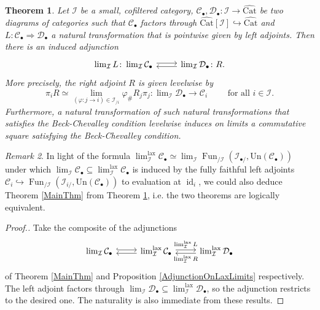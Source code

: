 \documentclass[a4paper,reqno,10pt]{amsart}
\newtheorem{theorem}{Theorem}[section]
\theoremstyle{definition}
\theoremstyle{remark}
\newtheorem{remark}[theorem]{Remark}
\newcommand{\sqb}[1]{\left\lbrack #1\right\rbrack}
\newcommand{\C}{\mathcal{C}}
\newcommand{\D}{\mathcal{D}}
\newcommand{\I}{\mathcal{I}}
\newcommand{\id}{\operatorname{id}}
\newcommand{\Fun}{\operatorname{Fun}}
\newcommand{\Un}{\mathrm{Un}}
\newcommand{\Cat}{\mathrm{Cat}}
\newcommand{\lax}{\mathrm{lax}}
\newcommand{\Adj}{\arrow[r,shift left=0.2em]\arrow[r,leftarrow,shift right=0.2em]}
\begin{document}
\begin{theorem}\label{Adjunction}
Let $\I$ be a small, cofiltered category, $\C_{\bullet},\D_{\bullet}\colon\I\rightarrow\widehat{\Cat}$ be two diagrams of categories such that $\C_{\bullet}$ factors through $\widehat{\Cat}\sqb{\I}\hookrightarrow\widehat{\Cat}$ and $L\colon\C_{\bullet}\Rightarrow\D_{\bullet}$ a natural transformation that is pointwise given by left adjoints. Then there is an induced adjunction
\begin{equation*}
\begin{tikzcd}
\lim_{\I}L\colon\lim_{\I}\C_{\bullet}\Adj & \lim_{\I}\D_{\bullet}\colon R.
\end{tikzcd}
\end{equation*}
More precisely, the right adjoint $R$ is given levelwise by
\begin{equation*}
\pi_iR\simeq\lim_{(\varphi\colon j\rightarrow i)\in\I_{/i}}\varphi_{\#}R_j\pi_j\colon\lim\nolimits_{\I}\D_{\bullet}\rightarrow\C_i\qquad\text{ for all }i\in\I.
\end{equation*}
Furthermore, a natural transformation of such natural transformations that satisfies the Beck-Chevalley condition levelwise induces on limits a commutative square satisfying the Beck-Chevalley condition.
\end{theorem}
\begin{remark}
In light of the formula $\lim^{\lax}_{\I}\C_{\bullet}\simeq\lim_{\I}\Fun_{/\I}(\I_{\bullet/},\Un(\C_{\bullet}))$ under which $\lim_{\I}\C_{\bullet}\subseteq\lim^{\lax}_{\I}\C_{\bullet}$ is induced by the fully faithful left adjoints $\C_i\hookrightarrow\Fun_{/\I}(\I_{i/},\Un(\C_{\bullet}))$ to evaluation at $\id_i$, we could also deduce Theorem \ref{MainThm} from Theorem \ref{Adjunction}, i.e. the two theorems are logically equivalent.
\end{remark}
\begin{proof}[Proof.]
Take the composite of the adjunctions
\begin{equation*}
\begin{tikzcd}
\lim_{\I}\C_{\bullet}\arrow[r,shift left=0.2em,hookrightarrow] & \lim^{\lax}_{\I}\C_{\bullet}\arrow[l,shift left=0.2em]\arrow[r,"\lim^{\lax}_{\I}L",shift left=0.2em] & \lim^{\lax}_{\I}\D_{\bullet}\arrow[l,"\lim^{\lax}_{\I}R",shift left=0.2em]
\end{tikzcd}
\end{equation*}
of Theorem \ref{MainThm} and Proposition \ref{AdjunctionOnLaxLimits} respectively. The left adjoint factors through $\lim_{\I}\D_{\bullet}\subseteq\lim^{\lax}_{\I}\D_{\bullet}$, so the adjunction restricts to the desired one. The naturality is also immediate from these results.
\end{proof}
\end{document}
